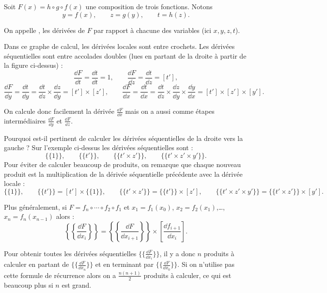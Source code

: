 \documentclass[11pt,class=report,crop=false]{standalone}
\begin{document}
Soit $F(x) = h\circ g \circ f(x)$ une composition de trois fonctions. Notons
$$y=f(x), \qquad z = g(y), \qquad t = h(z).$$

On appelle , les dérivées de $F$ par rapport à chacune des variables (ici $x,y,z,t$).


Dans ce graphe de calcul, les dérivées locales sont entre crochets.
Les dérivées séquentielles sont entre accolades doubles (lues en partant de la droite à partir de la figure ci-dessus) :
$$\frac{\dd F}{\dd t} = \frac{\dd t}{\dd t} = 1,
\qquad
\frac{\dd F}{\dd z} = \frac{\dd t}{\dd z} = [t'],
$$
$$
\frac{\dd F}{\dd y} = \frac{\dd t}{\dd y} = \frac{\dd t}{\dd z}\times\frac{\dd z}{\dd y}  = [t'] \times [z'],
\qquad
\frac{\dd F}{\dd x} = \frac{\dd t}{\dd x} = \frac{\dd t}{\dd z}\times\frac{\dd z}{\dd y}\times\frac{\dd y}{\dd x}  = [t'] \times [z'] \times [y'].
$$

On calcule donc facilement la dérivée $\frac{\dd F}{\dd x}$ mais on a aussi comme étapes intermédiaires $\frac{\dd F}{\dd y}$ et $\frac{\dd F}{\dd z}$.


Pourquoi est-il pertinent de calculer les dérivées séquentielles de la droite vers la gauche ?
Sur l'exemple ci-dessus les dérivées séquentielles sont :
$$ \{\{1\}\},
\qquad 
 \{\{t'\}\},
\qquad 
 \{\{t' \times z' \}\} ,
\qquad 
 \{\{t' \times z' \times y'\}\}.$$
Pour éviter de calculer beaucoup de produits, on remarque que chaque nouveau produit est la multiplication de la dérivée séquentielle précédente avec la dérivée locale :
$$ \{\{1\}\},
\qquad 
 \{\{t'\}\} = [t'] \times \{\{1\}\},
\qquad 
 \{\{t' \times z' \}\} =  \{\{t'\}\}\times [z'],
\qquad 
 \{\{t' \times z' \times y'\}\} = \{\{t' \times z' \}\}\times [y'].$$

\bigskip 
Plus généralement, si $F = f_n\circ \cdots \circ f_2 \circ f_1$ et $x_1 = f_1(x_0)$, $x_2 = f_2(x_1)$,\ldots, $x_n = f_n(x_{n-1})$ alors :
$$ \left\{\left\{\frac{\dd F}{\dd x_i} \right\}\right\} =  \left\{\left\{\frac{\dd F}{\dd x_{i+1}} \right\}\right\} \times \left[\frac{\dd f_{i+1}}{\dd x_{i}}\right].$$


Pour obtenir toutes les dérivées séquentielles $\{\{\frac{\dd F}{\dd x_i} \}\}$, il y a donc $n$ produits à calculer en partant de $\{\{\frac{\dd F}{\dd x_n} \}\}$ et en terminant par $\{\{\frac{\dd F}{\dd x_0} \}\}$. Si on n'utilise pas cette formule de récurrence alors on a $\frac{n(n+1)}{2}$ produits à calculer, ce qui est beaucoup plus si $n$ est grand.
\end{document}
